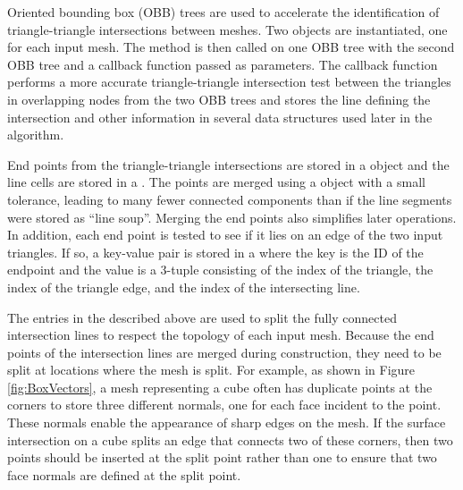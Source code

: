 \documentclass{InsightArticle}
\begin{document}
Oriented bounding box (OBB) trees are used to accelerate the identification of triangle-triangle intersections between meshes. Two  objects are instantiated, one for each input mesh. The method  is then called on one OBB tree with the second OBB tree and a callback function passed as parameters. The callback function performs a more accurate triangle-triangle intersection test between the triangles in overlapping nodes from the two OBB trees and stores the line defining the intersection and other information in several data structures used later in the algorithm.

End points from the triangle-triangle intersections are stored in a  object and the line cells are stored in a . The points  are merged using a  object with a small tolerance, leading to many fewer connected components than if the line segments were stored as ``line soup''. Merging the end points also simplifies later operations. In addition, each end point is tested to see if it lies on an edge of the two input triangles. If so, a key-value pair is stored in a  where the key is the ID of the endpoint and the value is a 3-tuple consisting of the index of the triangle, the index of the triangle edge, and the index of the intersecting line.

The entries in the  described above are used to split the fully connected intersection lines to respect the topology of each input mesh. Because the end points of the intersection lines are merged during construction, they need to be split at locations where the mesh is split. For example, as shown in Figure \ref{fig:BoxVectors}, a mesh representing a cube often has duplicate points at the corners to store three different normals, one for each face incident to the point. These normals enable the appearance of sharp edges on the mesh. If the surface intersection on a cube splits an edge that connects two of these corners, then two points should be inserted at the split point rather than one to ensure that two face normals are defined at the split point.
\end{document}
